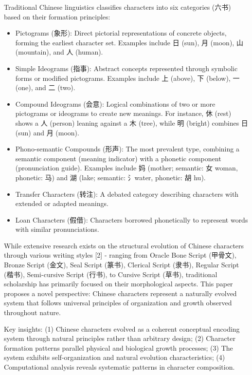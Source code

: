 \documentclass[
  11pt,
  letterpaper,
]{article}
\begin{document}
Traditional Chinese linguistics classifies characters into six
categories (六书) based on their formation principles:

\begin{itemize}
\item
  Pictograms (象形): Direct pictorial representations of concrete
  objects, forming the earliest character set. Examples include 日
  (sun), 月 (moon), 山 (mountain), and 人 (human).
\item
  Simple Ideograms (指事): Abstract concepts represented through
  symbolic forms or modified pictograms. Examples include 上 (above), 下
  (below), 一 (one), and 二 (two).
\item
  Compound Ideograms (会意): Logical combinations of two or more
  pictograms or ideograms to create new meanings. For instance, 休
  (rest) shows a 人 (person) leaning against a 木 (tree), while 明
  (bright) combines 日 (sun) and 月 (moon).
\item
  Phono-semantic Compounds (形声): The most prevalent type, combining a
  semantic component (meaning indicator) with a phonetic component
  (pronunciation guide). Examples include 妈 (mother; semantic: 女
  woman, phonetic: 马) and 湖 (lake; semantic: 氵water, phonetic: 胡
  hu).
\item
  Transfer Characters (转注): A debated category describing characters
  with extended or adapted meanings.
\item
  Loan Characters (假借): Characters borrowed phonetically to represent
  words with similar pronunciations.
\end{itemize}

While extensive research exists on the structural evolution of Chinese
characters through various writing styles {[}2{]} - ranging from Oracle
Bone Script (甲骨文), Bronze Script (金文), Seal Script (篆书), Clerical
Script (隶书), Regular Script (楷书), Semi-cursive Script (行书), to
Cursive Script (草书), traditional scholarship has primarily focused on
their morphological aspects. This paper proposes a novel perspective:
Chinese characters represent a naturally evolved system that follows
universal principles of organization and growth observed throughout
nature.

Key insights: (1) Chinese characters evolved as a coherent conceptual
encoding system through natural principles rather than arbitrary design;
(2) Character formation patterns parallel physical and biological growth
processes; (3) The system exhibits self-organization and natural
evolution characteristics; (4) Computational analysis reveals systematic
patterns in character composition.
\end{document}
